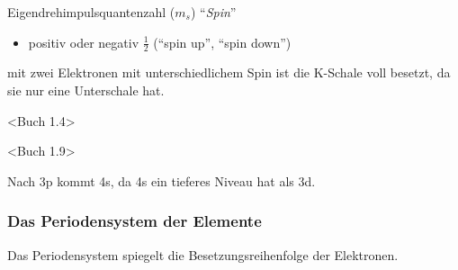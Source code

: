 Eigendrehimpulsquantenzahl ($m_s$) ``\textit{Spin}''
\begin{itemize}
	\item positiv oder negativ $\frac{1}{2}$ (``spin up'', ``spin down'')
\end{itemize}
\Ra mit zwei Elektronen mit unterschiedlichem Spin ist die K-Schale voll besetzt, da sie nur eine Unterschale hat.

<Buch 1.4>

<Buch 1.9>

Nach 3p kommt 4s, da 4s ein tieferes Niveau hat als 3d.

\subsubsection{Das Periodensystem der Elemente}

Das Periodensystem spiegelt die Besetzungsreihenfolge der Elektronen.
